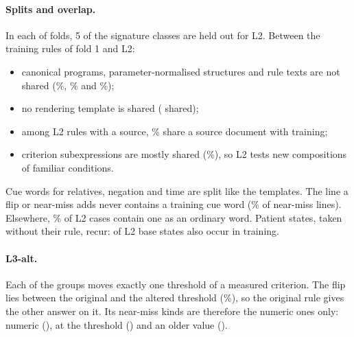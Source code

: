 \paragraph{Splits and overlap.}
In each of  folds, 5 of the 
signature classes are held out for L2. Between the training rules of fold 1 and L2:
\begin{itemize}
\item canonical programs, parameter-normalised structures and rule texts are not shared
(\%, \% and
\%);
\item no rendering template is shared ( shared);
\item among L2 rules with a source, \% share a
source document with training;
\item criterion subexpressions are mostly shared (\%), so L2
tests new compositions of familiar conditions.
\end{itemize}
Cue words for relatives, negation and time are split like the templates. The line a flip or near-miss adds
never contains a training cue word (\% of
near-miss lines). Elsewhere, \% of L2 cases contain
one as an ordinary word. Patient states, taken without their rule, recur:
 of
 L2 base states also occur in training.

\paragraph{L3-alt.}
Each of the  groups moves exactly one threshold of a measured criterion.
The flip lies between the original and the altered threshold
(\%), so the original rule gives the other answer
on it. Its near-miss kinds are therefore the numeric ones only: numeric
(), at the threshold
() and an older value
().

